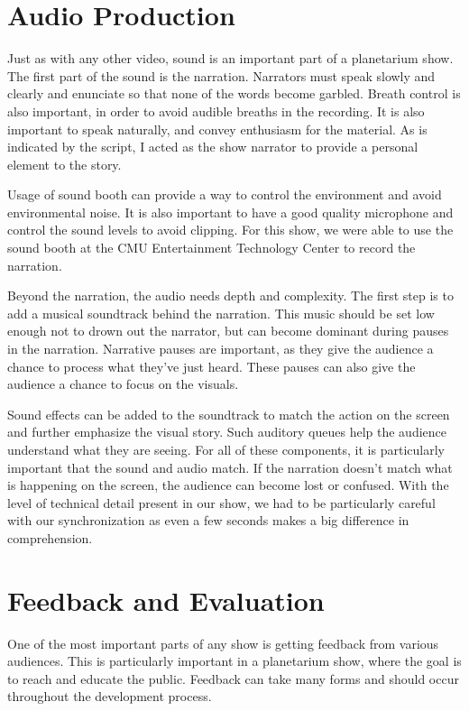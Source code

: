 \section{Audio Production}

Just as with any other video, sound is an important part of a planetarium show. 
The first part of the sound is the narration. Narrators must speak slowly and clearly and enunciate so that none of the words become garbled. Breath control is also important, in order to avoid audible breaths in the recording. It is also important to speak naturally, and convey enthusiasm for the material. As is indicated by the script, I acted as the show narrator to provide a personal element to the story. 

Usage of sound booth can provide a way to control the environment and avoid environmental noise. It is also important to have a good quality microphone and control the sound levels to avoid clipping. For this show, we were able to use the sound booth at the CMU Entertainment Technology Center to record the narration.  

Beyond the narration, the audio needs depth and complexity. The first step is to add a musical soundtrack behind the narration. This music should be set low enough not to drown out the narrator, but can become dominant during pauses in the narration. Narrative pauses are important, as they give the audience a chance to process what they've just heard. These pauses can also give the audience a chance to focus on the visuals. 

Sound effects can be added to the soundtrack to match the action on the screen and further emphasize the visual story. Such auditory queues help the audience understand what they are seeing. For all of these components, it is particularly important that the sound and audio match. If the narration doesn't match what is happening on the screen, the audience can become lost or confused. With the level of technical detail present in our show, we had to be particularly careful with our synchronization as even a few seconds makes a big difference in comprehension. 


\section{Feedback and Evaluation}

One of the most important parts of any show is getting feedback from various audiences. This is particularly important in a planetarium show, where the goal is to reach and educate the public. Feedback can take many forms and should occur throughout the development process. 



